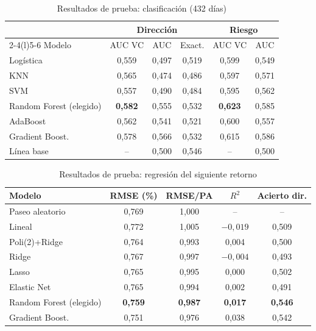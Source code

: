 \documentclass[conference]{IEEEtran}
\begin{document}
\begin{table}[t]
\caption{Resultados de prueba: clasificación (432 días)}
\label{tab:clf}
\centering
\footnotesize
\begin{tabular}{@{}lccccc@{}}
\toprule
 & \multicolumn{3}{c}{Dirección} & \multicolumn{2}{c}{Riesgo} \\
\cmidrule(lr){2-4}\cmidrule(l){5-6}
Modelo & AUC VC & AUC & Exact. & AUC VC & AUC \\
\midrule
Logística & 0,559 & 0,497 & 0,519 & 0,599 & 0,549 \\
KNN & 0,565 & 0,474 & 0,486 & 0,597 & 0,571 \\
SVM & 0,557 & 0,490 & 0,484 & 0,595 & 0,562 \\
Random Forest (elegido) & \textbf{0,582} & 0,555 & 0,532 & \textbf{0,623} & 0,585 \\
AdaBoost & 0,562 & 0,541 & 0,521 & 0,600 & 0,557 \\
Gradient Boost. & 0,578 & 0,566 & 0,532 & 0,615 & 0,586 \\
\midrule
Línea base & -- & 0,500 & 0,546 & -- & 0,500 \\
\bottomrule
\end{tabular}
\end{table}

\begin{table}[t]
\caption{Resultados de prueba: regresión del siguiente retorno}
\label{tab:reg}
\centering
\footnotesize
\begin{tabular}{@{}lcccc@{}}
\toprule
Modelo & RMSE (\%) & RMSE/PA & $R^2$ & Acierto dir. \\
\midrule
Paseo aleatorio & 0,769 & 1,000 & -- & -- \\
Lineal & 0,772 & 1,005 & $-0{,}019$ & 0,509 \\
Poli(2)+Ridge & 0,764 & 0,993 & 0,004 & 0,500 \\
Ridge & 0,767 & 0,997 & $-0{,}004$ & 0,493 \\
Lasso & 0,765 & 0,995 & 0,000 & 0,502 \\
Elastic Net & 0,765 & 0,994 & 0,002 & 0,491 \\
Random Forest (elegido) & \textbf{0,759} & \textbf{0,987} & \textbf{0,017} & \textbf{0,546} \\
Gradient Boost. & 0,751 & 0,976 & 0,038 & 0,542 \\
\bottomrule
\end{tabular}
\end{table}
\end{document}

